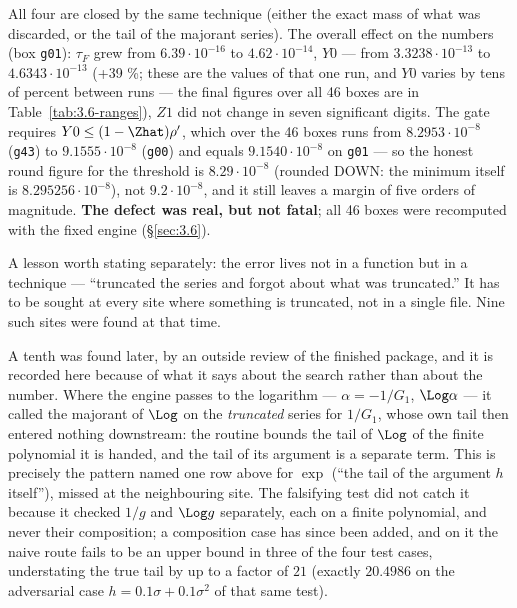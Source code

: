 All four are closed by the same technique (either the exact mass of what
was discarded, or the tail of the majorant series). The overall effect on
the numbers (box \texttt{g01}): $\tau_F$ grew from $6.39 \cdot 10^{-16}$ to $4.62 \cdot 10^{-14}$, $Y0$ --- from
$3.3238 \cdot 10^{-13}$ to $4.6343 \cdot 10^{-13}$ (+39 \%; these are the values of
that one run, and $Y0$ varies by tens of percent between runs --- the final
figures over all 46 boxes are in Table~\ref{tab:3.6-ranges}), $Z1$ did not change in seven
significant digits. The gate requires $Y0 \le (1-\Zhat)\rho'$, which over the 46 boxes runs from $8.2953\cdot 10^{-8}$ (\texttt{g43}) to $9.1555\cdot 10^{-8}$ (\texttt{g00}) and equals $9.1540\cdot 10^{-8}$ on \texttt{g01} --- so the honest round figure for the threshold is $8.29\cdot 10^{-8}$ (rounded DOWN: the minimum itself is $8.295256\cdot 10^{-8}$), not $9.2\cdot 10^{-8}$, and it still leaves a margin
of five orders of magnitude. \textbf{The defect was real, but not fatal}; all 46
boxes were recomputed with the fixed engine (\S\ref{sec:3.6}).

A lesson worth stating separately: the error lives not in a function but in
a technique --- ``truncated the series and forgot about what was truncated.''
It has to be sought at every site where something is truncated, not in a
single file. Nine such sites were found at that time.

A tenth was found later, by an outside review of the finished package, and it
is recorded here because of what it says about the search rather than about
the number. Where the engine passes to the logarithm --- $\alpha=-1/G_{1}$,
$\Log\alpha$ --- it called the majorant of $\Log$ on the \emph{truncated}
series for $1/G_{1}$, whose own tail then entered nothing downstream: the
routine bounds the tail of $\Log$ of the finite polynomial it is handed, and
the tail of its argument is a separate term. This is precisely the pattern
named one row above for $\exp$ (``the tail of the argument $h$ itself''),
missed at the neighbouring site. The falsifying test did not catch it because
it checked $1/g$ and $\Log g$ separately, each on a finite polynomial, and
never their composition; a composition case has since been added, and on it
the naive route fails to be an upper bound in three of the four test cases,
understating the true tail by up to a factor of $21$ (exactly $20.4986$ on the adversarial case $h = 0.1\sigma + 0.1\sigma^{2}$ of that same test).

